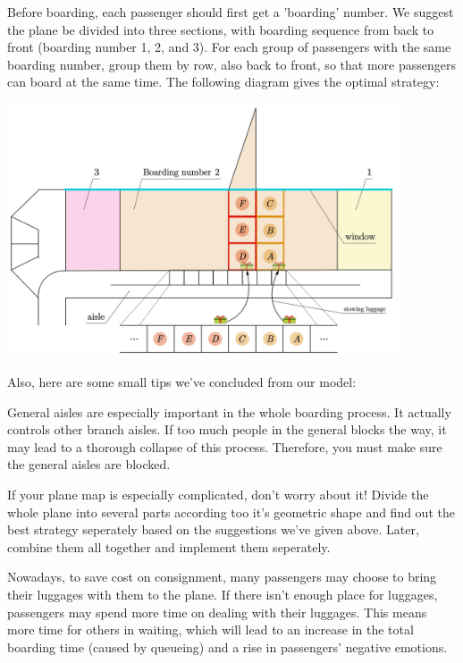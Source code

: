 \documentclass{article}
\theoremstyle{definition}
\theoremstyle{remark}
\numberwithin{equation}{section}
\begin{document}
\begin{itemize}
		Before boarding, each passenger should first get a 'boarding' number. We suggest the plane be divided into three sections, with boarding sequence from back to front (boarding number 1, 2, and 3). For each group of passengers with the same boarding number, group them by row, also back to front, so that more passengers can board at the same time. The following diagram gives the optimal strategy:
		\begin{center}
			\includegraphics[width=11.6cm]{advice.jpg}
		\end{center}
	\end{itemize}

	Also, here are some small tips we've concluded from our model:
	\begin{enumerate}
		
		General aisles are especially important in the whole boarding process. It actually controls other branch aisles. If too much people in the general blocks the way, it may lead to a thorough collapse of this process. Therefore, you must make sure the general aisles are blocked.
		
		If your plane map is especially complicated, don't worry about it! Divide the whole plane into several parts according too it's geometric shape and find out the best strategy seperately based on the suggestions we've given above. Later, combine them all together and implement them seperately.
		
		Nowadays, to save cost on consignment, many passengers may choose to bring their luggages with them to the plane. If there isn't enough place for luggages, passengers may spend more time on dealing with their luggages. This means more time for others in waiting, which will lead to an increase in the total boarding time (caused by queueing) and a rise in passengers' negative emotions.
	\end{enumerate}
\end{document}
